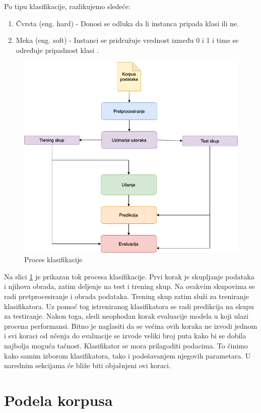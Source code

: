 \documentclass[12pt,oneside]{memoir}
\begin{document}
Po tipu klasifikacije, razlikujemo sledeće:

\begin{enumerate}
\item Čvrsta (eng. hard) - Donosi se odluka da li instanca pripada klasi ili ne. 
\item Meka (eng. soft) - Instanci se pridružuje vrednost između 0 i 1 i time se određuje pripadnost klasi \cite{JelenaPHD}.
\end{enumerate}

\begin{figure}[h!]
\centering
\includegraphics[width=.7\textwidth]{images/workflow.png}
\caption{Proces klasifikacije}
\label{img:workflow}
\end{figure}

Na slici \ref{img:workflow} je prikazan tok procesa klasifikacije. Prvi korak je skupljanje podataka i njihova obrada, zatim deljenje na test i trening skup. Na ovakvim skupovima se radi pretprocesiranje i obrada podataka. Trening skup zatim služi za treniranje klasifikatora. Uz pomoć tog istreniranog klasifikatora se radi predikcija na skupu za testiranje. Nakon toga, sledi neophodan korak evaluacije modela u koji ulazi procena performansi. Bitno je naglasiti da se većina ovih koraka ne izvodi jednom i svi koraci od učenja do evaluacije se izvode veliki broj puta kako bi se dobila najbolja moguća tačnost. Klasifikator se mora prilagoditi podacima. To činimo kako samim izborom klasifikatora, tako i podešavanjem njegovih parametara. U narednim sekcijama će bliže biti objašnjeni ovi koraci.  

\section{Podela korpusa}
\end{document}
